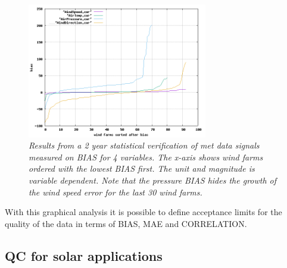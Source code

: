 \begin{figure}[h!]
\includegraphics[width=0.7\textwidth]{figures/met_bias.png}
\caption{\textit{Results from a 2 year statistical verification of met data signals measured on BIAS for 4 variables. The x-axis shows wind farms ordered with the lowest BIAS first. The unit and magnitude is variable dependent. Note that the pressure BIAS hides the growth of the wind speed error for the last 30 wind farms.}} 
\label{fig:met_bias}
\end{figure}

With this graphical analysis it is possible to define acceptance limits for the quality of the data in terms of BIAS, MAE and CORRELATION.

\newpage

\subsection{QC for solar applications}

